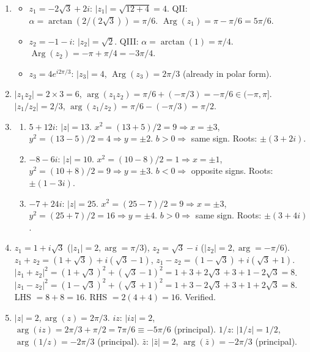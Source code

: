 \documentclass[11pt]{article}
\begin{document}
\begin{corrige}[Exercise 1]
\begin{enumerate}
    \item 
    \begin{itemize}
        \item $z_1 = -2\sqrt{3} + 2i$: $|z_1| = \sqrt{12+4} = 4$. QII: $\alpha = \arctan(2/(2\sqrt{3})) = \pi/6$. $\operatorname{Arg}(z_1) = \pi - \pi/6 = 5\pi/6$.
        \item $z_2 = -1 - i$: $|z_2| = \sqrt{2}$. QIII: $\alpha = \arctan(1) = \pi/4$. $\operatorname{Arg}(z_2) = -\pi + \pi/4 = -3\pi/4$.
        \item $z_3 = 4e^{i2\pi/3}$: $|z_3| = 4$, $\operatorname{Arg}(z_3) = 2\pi/3$ (already in polar form).
    \end{itemize}
    \item $|z_1z_2| = 2\times 3 = 6$, $\arg(z_1z_2) = \pi/6 + (-\pi/3) = -\pi/6 \in (-\pi,\pi]$. $|z_1/z_2| = 2/3$, $\arg(z_1/z_2) = \pi/6 - (-\pi/3) = \pi/2$.
    \item 
    \begin{enumerate}
        \item $5+12i$: $|z|=13$. $x^2=(13+5)/2=9 \Rightarrow x=\pm3$, $y^2=(13-5)/2=4 \Rightarrow y=\pm2$. $b>0 \Rightarrow$ same sign. Roots: $\pm(3+2i)$.
        \item $-8-6i$: $|z|=10$. $x^2=(10-8)/2=1 \Rightarrow x=\pm1$, $y^2=(10+8)/2=9 \Rightarrow y=\pm3$. $b<0 \Rightarrow$ opposite signs. Roots: $\pm(1-3i)$.
        \item $-7+24i$: $|z|=25$. $x^2=(25-7)/2=9 \Rightarrow x=\pm3$, $y^2=(25+7)/2=16 \Rightarrow y=\pm4$. $b>0 \Rightarrow$ same sign. Roots: $\pm(3+4i)$.
    \end{enumerate}
    \item $z_1=1+i\sqrt{3}$ ($|z_1|=2, \arg=\pi/3$), $z_2=\sqrt{3}-i$ ($|z_2|=2, \arg=-\pi/6$). 
    $z_1+z_2 = (1+\sqrt{3}) + i(\sqrt{3}-1)$, $z_1-z_2 = (1-\sqrt{3}) + i(\sqrt{3}+1)$.
    $|z_1+z_2|^2 = (1+\sqrt{3})^2+(\sqrt{3}-1)^2 = 1+3+2\sqrt{3}+3+1-2\sqrt{3}=8$.
    $|z_1-z_2|^2 = (1-\sqrt{3})^2+(\sqrt{3}+1)^2 = 1+3-2\sqrt{3}+3+1+2\sqrt{3}=8$.
    LHS $= 8+8=16$. RHS $= 2(4+4)=16$. Verified.
    \item $|z|=2, \arg(z)=2\pi/3$.
    $iz$: $|iz|=2$, $\arg(iz)=2\pi/3+\pi/2=7\pi/6 \equiv -5\pi/6$ (principal).
    $1/z$: $|1/z|=1/2$, $\arg(1/z)=-2\pi/3$ (principal).
    $\bar{z}$: $|\bar{z}|=2$, $\arg(\bar{z})=-2\pi/3$ (principal).
\end{enumerate}
\end{corrige}
\end{document}

